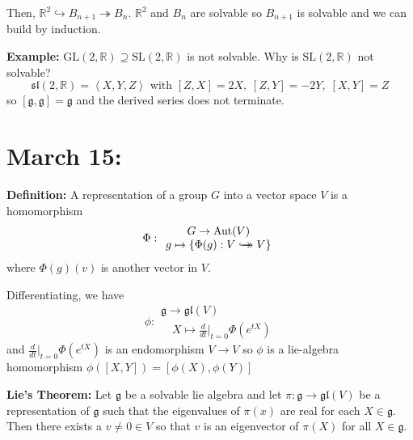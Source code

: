 \documentclass[12pt]{article}
\newcommand{\R}{\mathbb{R}}
\newcommand{\brak}[1]{\left\langle #1 \right\rangle}
\newcommand{\SL}{\text{SL}}
\newcommand{\GL}{\text{GL}}
\newcommand{\biject}{\hookrightarrow \hspace{-8pt} \rightarrow}
\newcommand{\g}{\mathfrak{g}}
\renewcommand{\sl}{\mathfrak{sl}}
\newcommand{\gl}{\mathfrak{gl}}
\newcommand{\Aut}{\text{Aut}}
\newenvironment*{tbox}[2][gray]{
    \begin{tcolorbox}[
        parbox=false,
        colback=#1!5!white,
        colframe=#1!75!black,
        breakable,
        title={#2}
    ]}
    {\end{tcolorbox}}
\begin{document}
\begin{tbox}{\textbf{Claim:} The upper triangular matrices ($U_n$) are solvable}
        Then, $\R^2 \hookrightarrow B_{n+1} \twoheadrightarrow B_n$. $\R^2$ and $B_n$ are solvable so $B_{n+1}$ is solvable and we can build by induction. 
    \end{tbox}

    \textbf{Example:} $\GL(2, \R) \supseteq \SL(2, \R)$ is not solvable. Why is $\SL(2, \R)$ not solvable? 
    \[\sl(2, \R) = \brak{X, Y, Z} \text{ with } [Z, X] = 2X,\; [Z, Y] = -2Y, \; [X, Y] = Z\]
    so $[\g, \g] = \g$ and the derived series does not terminate. 

\section{March 15:} 
    \textbf{Definition:} A representation of a group $G$ into a vector space $V$ is a homomorphism 
    \[\Phi: \begin{array}{c}
        G \to \Aut(V)\\ 
        g \mapsto \{\Phi(g): V \biject  V\}
    \end{array}\]
    where $\Phi(g)(v)$ is another vector in $V$. 

    Differentiating, we have 
    \[\phi: \begin{array}{c}
        \g \to \gl(V)\\ 
        \quad X \mapsto \frac{d}{dt}\bigg\vert_{t=0} \Phi(e^{tX})
    \end{array}\]
    and $\frac{d}{dt}\bigg\vert_{t=0} \Phi(e^{tX})$ is an endomorphism $V \to V$ so $\phi$ is a lie-algebra homomorphism $\phi([X, Y]) = [\phi(X), \phi(Y)]$ 

    \textbf{Lie's Theorem:} Let $\g$ be a solvable lie algebra and let $\pi: \g \to \gl(V)$ be a representation of $\g$ such that the eigenvalues of $\pi(x)$ are real for each $X \in \g$. Then there exists a $v \neq 0 \in V$ so that $v$ is an eigenvector of $\pi(X)$ for all $X \in \g$.
\end{document}

